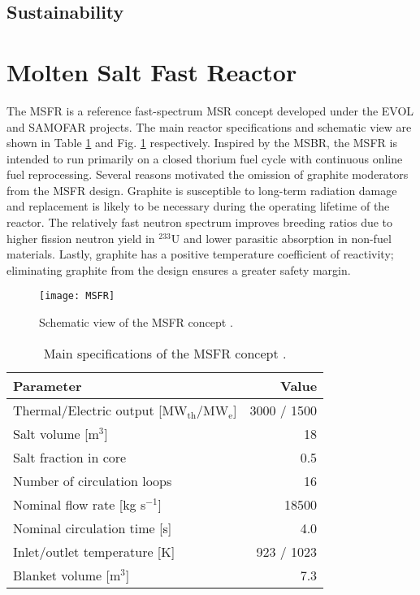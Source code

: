 \subsection{Sustainability}



\section{Molten Salt Fast Reactor}

The \gls{MSFR} is a reference fast-spectrum \gls{MSR} concept developed
under the \gls{EVOL} and \gls{SAMOFAR} projects. The main reactor
specifications and schematic view are shown in Table \ref{table:msfr} and Fig.
\ref{fig:msfr} respectively. Inspired by the \gls{MSBR}, the \gls{MSFR} is
intended to run primarily on a closed thorium fuel cycle with
continuous online fuel reprocessing. Several reasons motivated the omission of
graphite moderators from the \gls{MSFR} design. Graphite is susceptible to
long-term radiation damage and replacement is likely to be necessary during
the operating lifetime of the reactor. The relatively fast neutron spectrum
improves breeding ratios due to higher fission neutron yield in $^{233}$U and
lower parasitic absorption in non-fuel materials. Lastly, graphite has a
positive temperature coefficient of reactivity; eliminating graphite from the
design ensures a greater safety margin.
%
\begin{figure}[htb!] 
	\centering
	\texttt{[image: MSFR]}
	\caption{Schematic view of the MSFR concept \cite{serp_molten_2014}.}
	\label{fig:msfr}
\end{figure}
%
\begin{table}[htb!]
	\caption{Main specifications of the \gls{MSFR} concept
				\cite{serp_molten_2014}.}
	\centering
	\begin{tabular}{ l r }
		\hline
		Parameter & Value \\
		\hline
		Thermal/Electric output [MW$_{\text{th}}$/MW$_{\text{e}}$] & 3000 /
		1500 
		\\
		Salt volume [m$^3$] & 18 \\
		Salt fraction in core & 0.5 \\
		Number of circulation loops & 16 \\
		Nominal flow rate [kg s$^{-1}$] & 18500  \\
		Nominal circulation time [s] & 4.0 \\
		Inlet/outlet temperature [K] & 923 / 1023 \\
		Blanket volume [m$^3$] & 7.3\\
		\hline
	\end{tabular}
	\label{table:msfr}
\end{table}

